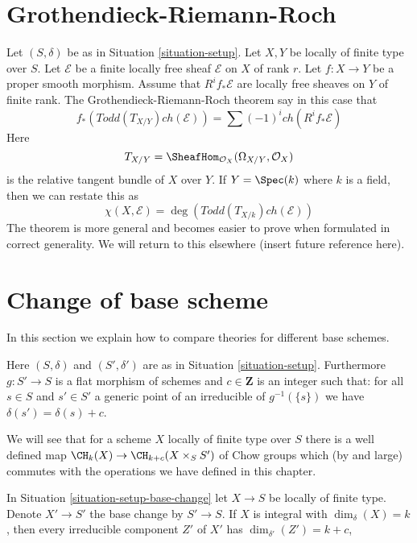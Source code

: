 \section{Grothendieck-Riemann-Roch}
\label{section-grr}

\noindent
Let $(S, \delta)$ be as in
Situation \ref{situation-setup}.
Let $X, Y$ be locally of finite type over $S$.
Let $\mathcal{E}$ be a finite locally free sheaf
${\mathcal E}$ on $X$ of rank $r$.
Let $f : X \to Y$ be a proper smooth morphism.
Assume that $R^if_*\mathcal{E}$ are locally free
sheaves on $Y$ of finite rank.
The Grothendieck-Riemann-Roch theorem say in this
case that
$$
f_*(Todd(T_{X/Y}) ch(\mathcal{E}))
=
\sum (-1)^i ch(R^if_*\mathcal{E})
$$
Here
$$
T_{X/Y} = \SheafHom_{\mathcal{O}_X}(\Omega_{X/Y}, \mathcal{O}_X)
$$
is the relative tangent bundle of $X$ over $Y$. If $Y = \Spec(k)$
where $k$ is a field, then we can restate this as
$$
\chi(X, \mathcal{E}) = \deg(Todd(T_{X/k}) ch(\mathcal{E}))
$$
The theorem is more general and becomes easier to prove
when formulated in correct generality. We will return to
this elsewhere (insert future reference here).







\section{Change of base scheme}
\label{section-change-base}

\noindent
In this section we explain how to compare theories for different
base schemes.

\begin{situation}
\label{situation-setup-base-change}
Here  $(S, \delta)$ and $(S', \delta')$ are as in
Situation \ref{situation-setup}. Furthermore $g : S' \to S$
is a flat morphism of schemes and $c \in \mathbf{Z}$
is an integer such that: for all $s \in S$ and $s' \in S'$
a generic point of an irreducible of $g^{-1}(\{s\})$ we have
$\delta(s') = \delta(s) + c$.
\end{situation}

\noindent
We will see that for a scheme $X$ locally of finite type over $S$
there is a well defined map $\CH_k(X) \to \CH_{k + c}(X \times_S S')$
of Chow groups which (by and large) commutes with the operations
we have defined in this chapter.

\begin{lemma}
\label{lemma-dimension-base-change}
In Situation \ref{situation-setup-base-change} let $X \to S$ be locally
of finite type. Denote $X' \to S'$ the base change by $S' \to S$.
If $X$ is integral with $\dim_\delta(X) = k$, then
every irreducible component $Z'$ of $X'$ has $\dim_{\delta'}(Z') = k + c$,
\end{lemma}

